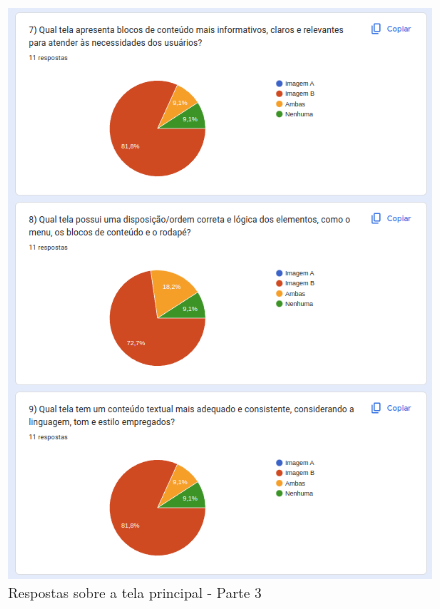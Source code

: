 \begin{figure}[!h]
	\begin{center}
	    \includegraphics[scale=0.7]{figs/Answers/Professionals/14.png}
	\end{center}
	\caption{\label{APC_TP03}Respostas sobre a tela principal - Parte 3}
\end{figure}

\newpage

